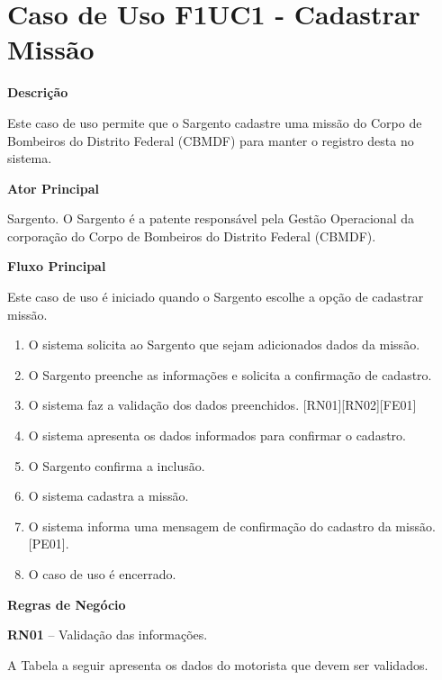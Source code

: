   \section{Caso de Uso F1UC1 - Cadastrar Missão}

  {\raggedright
      \textbf{Descrição}
  }
  
    Este caso de uso permite que o Sargento cadastre uma missão do Corpo de Bombeiros do Distrito Federal (CBMDF)  para manter o registro desta no sistema.    
  
  {\raggedright
      \textbf{Ator Principal}
  }

    Sargento. O Sargento é a patente responsável pela Gestão Operacional da corporação do Corpo de Bombeiros do Distrito Federal (CBMDF).
  
  {\raggedright
      \textbf{Fluxo Principal}
  }
  
    Este caso de uso é iniciado quando o Sargento escolhe a opção de cadastrar missão.
  
  \begin{enumerate}
  \item O sistema solicita ao Sargento que sejam adicionados dados da missão. 
  \item O Sargento preenche as informações e solicita a confirmação de cadastro.
  \item O sistema faz a validação dos dados preenchidos. [RN01][RN02][FE01]
  \item O sistema apresenta os dados informados para confirmar o cadastro.
  \item O Sargento confirma a inclusão. 
  \item O sistema cadastra a missão.
  \item O sistema informa uma mensagem de confirmação do cadastro da missão.[PE01].
  \item O caso de uso é encerrado.
  \end{enumerate}
  
  \pagebreak
  
   {\raggedright
      \textbf{Regras de Negócio}
   }
   
   \textbf{RN01} – Validação das informações.
   
   A Tabela a seguir apresenta os dados do motorista que devem ser validados.
   
